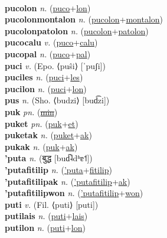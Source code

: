  \label{puco} \\
\textbf{pucolon} \textit{n.} (\hyperref[puco]{puco}+\hyperref[lon]{lon})
 \label{pucolon} \\
\textbf{pucolonmontalon} \textit{n.} (\hyperref[pucolon]{pucolon}+\hyperref[montalon]{montalon})
 \label{pucolonmontalon} \\
\textbf{pucolonpatolon} \textit{n.} (\hyperref[pucolon]{pucolon}+\hyperref[patolon]{patolon})
 \label{pucolonpatolon} \\
\textbf{pucocalu} \textit{v.} (\hyperref[puco]{puco}+\hyperref[calu]{calu})
 \label{pucocalu} \\
\textbf{pucopal} \textit{n.} (\hyperref[puco]{puco}+\hyperref[pal]{pal})
 \label{pucopal} \\
\textbf{puci} \textit{v.} (Epo. ⟨puŝi⟩ [ˈpuʃi])
 \label{puci} \\
\textbf{puciles} \textit{n.} (\hyperref[puci]{puci}+\hyperref[les]{les})
 \label{puciles} \\
\textbf{pucilon} \textit{n.} (\hyperref[puci]{puci}+\hyperref[lon]{lon})
 \label{pucilon} \\
\textbf{pus} \textit{n.} (Sho. ⟨budzi⟩ [bud͡zi])
 \label{pus} \\
\textbf{puk} \textit{pn.} (\hyperref[min]{\sout{min}})
 \label{puk} \\
\textbf{puket} \textit{pn.} (\hyperref[puk]{puk}+\hyperref[et]{et})
 \label{puket} \\
\textbf{puketak} \textit{n.} (\hyperref[puket]{puket}+\hyperref[ak]{ak})
 \label{puketak} \\
\textbf{pukak} \textit{n.} (\hyperref[puk]{puk}+\hyperref[ak]{ak})
 \label{pukak} \\
\textbf{'puta} \textit{n.} ({\devanagari{}बुद्ध} [bud̚˨dʱɐ˦])
 \label{'puta} \\
\textbf{'putafitilip} \textit{n.} (\hyperref['puta]{'puta}+\hyperref[fitilip]{fitilip})
 \label{'putafitilip} \\
\textbf{'putafitilipak} \textit{n.} (\hyperref['putafitilip]{'putafitilip}+\hyperref[ak]{ak})
 \label{'putafitilipak} \\
\textbf{'putafitilipwon} \textit{n.} (\hyperref['putafitilip]{'putafitilip}+\hyperref[won]{won})
 \label{'putafitilipwon} \\
\textbf{puti} \textit{v.} (Fil. ⟨puti⟩ [puti])
 \label{puti} \\
\textbf{putilais} \textit{n.} (\hyperref[puti]{puti}+\hyperref[lais]{lais})
 \label{putilais} \\
\textbf{putilon} \textit{n.} (\hyperref[puti]{puti}+\hyperref[lon]{lon})
